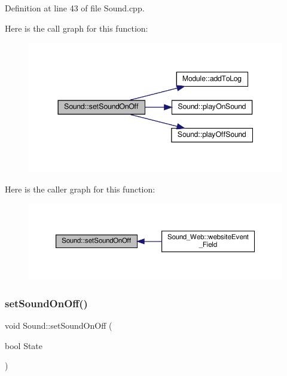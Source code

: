 Definition at line 43 of file Sound.\+cpp.

Here is the call graph for this function\+:
\nopagebreak
\begin{figure}[H]
\begin{center}
\leavevmode
\includegraphics[width=344pt]{class_sound_a6917e650a721b0e7fc6d998edf6a3cf7_cgraph}
\end{center}
\end{figure}
Here is the caller graph for this function\+:
\nopagebreak
\begin{figure}[H]
\begin{center}
\leavevmode
\includegraphics[width=350pt]{class_sound_a6917e650a721b0e7fc6d998edf6a3cf7_icgraph}
\end{center}
\end{figure}
\mbox{\label{class_sound_a6917e650a721b0e7fc6d998edf6a3cf7}} 
\subsubsection{\texorpdfstring{set\+Sound\+On\+Off()}{setSoundOnOff()}\hspace{0.1cm}{\footnotesize\ttfamily [2/2]}}
{\footnotesize\ttfamily void Sound\+::set\+Sound\+On\+Off (\begin{DoxyParamCaption}\item[{bool}]{State }\end{DoxyParamCaption})\hspace{0.3cm}{\ttfamily [protected]}}



